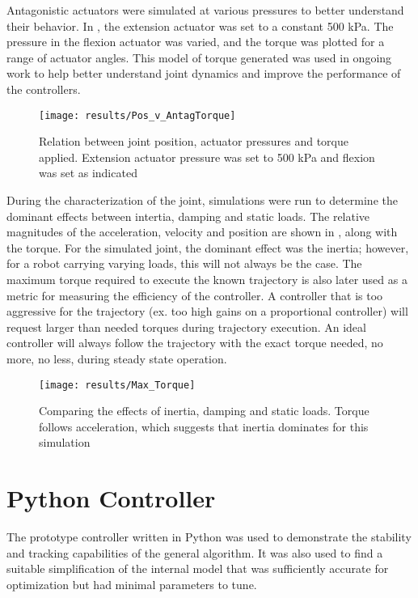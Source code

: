 
Antagonistic actuators were simulated at various pressures to better understand
their behavior. In , the extension
actuator was set to a constant 500 kPa. The pressure in the flexion actuator was
varied, and the torque was plotted for a range of actuator angles. This model of
torque generated was used in ongoing work to help better understand joint
dynamics and improve the performance of the controllers.

\begin{figure}
\centering
\texttt{[image: results/Pos\_v\_AntagTorque]}
\caption{Relation between joint position, actuator pressures and
torque applied. Extension actuator pressure was set to 500 kPa and flexion was
set as indicated}
\label{fig:AntagonisticPressureTorque}
\end{figure}

During the characterization of the joint, simulations were run to determine the
dominant effects between intertia, damping and static loads. The relative 
magnitudes of the acceleration, velocity and position are shown in 
, along with the
torque. For the simulated joint, the dominant effect was the inertia; however,
for a robot carrying varying loads, this will not always be the case. The 
maximum torque required to execute the known trajectory is also later used as a
metric for measuring the efficiency of the controller. A controller that is too
aggressive for the trajectory (ex. too high gains on a proportional controller)
will request larger than needed torques during trajectory execution. An ideal
controller will always follow the trajectory with the exact torque needed, no 
more, no less, during steady state operation.

\begin{figure}
\centering
\texttt{[image: results/Max\_Torque]}
\caption{Comparing the effects of inertia, damping and static loads. Torque follows acceleration, which suggests that inertia dominates for this simulation}
\label{fig:MaxTorque}
\end{figure}

\section{Python Controller}

The prototype controller written in Python was used to demonstrate the stability
and tracking capabilities of the general algorithm. It was also used to find a
suitable simplification of the internal model that was sufficiently accurate for
optimization but had minimal parameters to tune.

